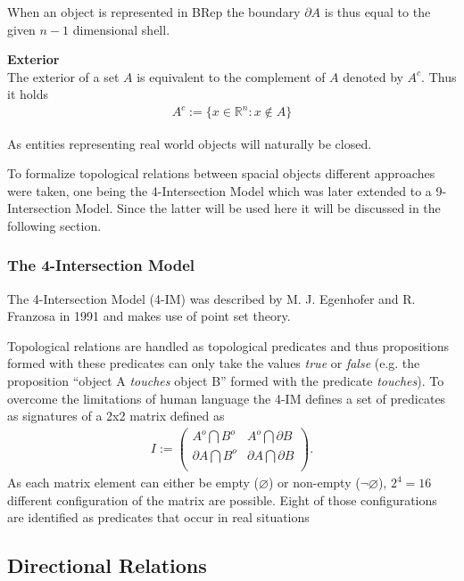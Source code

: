 \documentclass[paper=a4, fontsize=11pt]{scrartcl} %
\numberwithin{equation}{section} %
\numberwithin{figure}{section} %
\numberwithin{table}{section} %
\begin{document}
When an object is represented in BRep the boundary $\partial A$ is thus equal to the given $n-1$ dimensional shell.  

\textbf{Exterior} \\
The exterior of a set $A$ is equivalent to the complement of $A$ denoted by $A^c$. Thus it holds
\begin{align*}
  A^c:=\{x\in \mathbb{R}^n:x\notin A\}
\end{align*}


As entities representing real world objects will naturally be closed.  

To formalize topological relations between spacial objects different approaches were taken, one being the 4-Intersection Model which was later extended to a 9-Intersection Model. Since the latter will be used here it will be discussed in the following section.

\subsubsection{The 4-Intersection Model}
The 4-Intersection Model (4-IM) was described by M. J. Egenhofer and R. Franzosa in 1991 \cite{Egenhofer:1991:IJGIS} and makes use of point set theory. 


Topological relations are handled as topological predicates and thus propositions formed with these predicates can only take the values \emph{true} or \emph{false} (e.g. the proposition ``object A \emph{touches} object B'' formed with the predicate \emph{touches}). 
To overcome the limitations of human language the 4-IM defines a set of predicates as signatures of a 2x2 matrix defined as 
\begin{align*}
  I := \begin{pmatrix}
    A^{o} \bigcap B^{o}        & A^{o} \bigcap \partial B  \\
    \partial A \bigcap B^{o}  & \partial A \bigcap \partial B  \\
  \end{pmatrix}.
\end{align*}
As each matrix element can either be empty ($\varnothing$) or non-empty ($\neg\varnothing$), $2^4 = 16$ different configuration of the matrix are possible. Eight of those configurations are identified as predicates that occur in real situations 

\subsection{Directional Relations}\label{sec:directional-relations}
\end{document}
